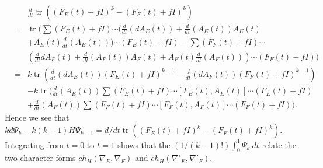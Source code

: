 \documentclass[a4paper,reqno]{amsart}
\DeclareMathOperator{\tr}{tr}
\theoremstyle{plain}
\theoremstyle{definition}
\theoremstyle{remark}
\numberwithin{equation}{section}
\numberwithin{figure}{section}
\newcommand{\<}{\langle}
\renewcommand{\>}{\rangle}
\begin{document}
\begin{eqnarray*} 
&   & \frac{d}{dt}\tr((F_E(t)+fI)^k - 
(F_F(t) + fI)^k)                         \\ 
& = & \tr(\sum (F_E(t) + fI) \cdots 
(\frac{d}{dt}(dA_E(t)) + \frac{d}{dt}(A_E(t)) 
A_E(t)                                    \\  
&   & + A_E(t)\frac{d}{dt}(A_E(t))) 
\cdots (F_E(t) + fI)                       
 - \sum (F_F(t)+fI)\cdots             \\ 
&   & (\frac{d}{dt} 
dA_F(t) + \frac{d}{dt}(A_F(t))A_F(t) 
+ A_F(t)\frac{d}{dt}(A_F(t)))\cdots 
(F_F(t) + fI))                                \\ 
& = & k\tr(\frac{d}{dt}(dA_E(t))(F_E(t) 
+ fI)^{k-1} - \frac{d}{dt}(dA_F(t))(F_F(t) 
+ fI)^{k-1})                                                 \\ 
&   & - k\tr(\frac{d}{dt}(A_E(t))\sum (F_E(t) + fI) 
\cdots [F_E(t),A_E(t)]\cdots 
(F_E(t) + fI)                                      \\ 
&   & + \frac{d}{dt}(A_F(t))\sum (F_F(t) + fI) 
\cdots [F_F(t),A_F(t)]\cdots (F_F(t) + fI)). 
\end{eqnarray*} 
Hence we see that $kd\Psi_k - k(k-1)H\Psi_{k-1} = d/dt\tr((F_E(t) 
+ fI)^k - (F_F(t) + fI)^k)$.  Integrating 
from $t=0$ to $t=1$ shows that the $(1/(k-1)!)\int^1_0\Psi_k\ dt$ relate 
the two character forms $ch_H(\nabla_E,\nabla_F)$ and 
$ch_H(\nabla'_E,\nabla'_F)$.   
\end{document}
